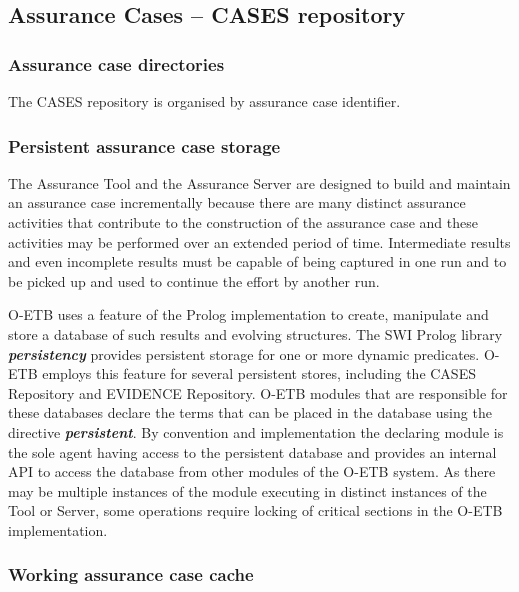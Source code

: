 \documentclass[12pt,twoside,a4paper]{article}
\begin{document}
\hypertarget{assurance-cases-cases-repository}{%
\subsection{Assurance Cases -- CASES repository}\label{assurance-cases-cases-repository}}

\hypertarget{assurance-case-directories}{%
\subsubsection{Assurance case directories}\label{assurance-case-directories}}

The CASES repository is organised by assurance case identifier.

\hypertarget{persistent-assurance-case-storage}{%
\subsubsection{Persistent assurance case storage}\label{persistent-assurance-case-storage}}

The Assurance Tool and the Assurance Server are designed to build and maintain an assurance case incrementally because there are many distinct assurance activities that contribute to the construction of the assurance case and these activities may be performed over an extended period of time. Intermediate results and even incomplete results must be capable of being captured in one run and to be picked up and used to continue the effort by another run.

O-ETB uses a feature of the Prolog implementation to create, manipulate and store a database of such results and evolving structures. The SWI Prolog library \emph{\textbf{persistency}} provides persistent storage for one or more dynamic predicates. O-ETB employs this feature for several persistent stores, including the CASES Repository and EVIDENCE Repository. O-ETB modules that are responsible for these databases declare the terms that can be placed in the database using the directive \emph{\textbf{persistent}}. By convention and implementation the declaring module is the sole agent having access to the persistent database and provides an internal API to access the database from other modules of the O-ETB system. As there may be multiple instances of the module executing in distinct instances of the Tool or Server, some operations require locking of critical sections in the O-ETB implementation.

\hypertarget{working-assurance-case-cache}{%
\subsubsection{Working assurance case cache}\label{working-assurance-case-cache}}
\end{document}
